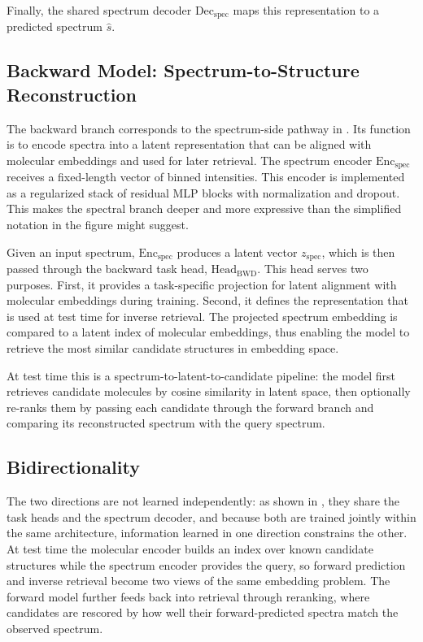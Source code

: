 Finally, the shared spectrum decoder $\mathrm{Dec}_{\mathrm{spec}}$ maps this representation to a predicted spectrum $\hat{s}$.

\subsection{Backward Model: Spectrum-to-Structure Reconstruction}

The backward branch corresponds to the spectrum-side pathway in . 
Its function is to encode spectra into a latent representation that can be aligned with molecular embeddings and used for later retrieval. The spectrum encoder $\mathrm{Enc}_{\mathrm{spec}}$ receives a fixed-length vector of binned intensities.
This encoder is implemented as a regularized stack of residual MLP blocks with normalization and dropout. 
This makes the spectral branch deeper and more expressive than the simplified notation in the figure might suggest.

Given an input spectrum, $\mathrm{Enc}_{\mathrm{spec}}$ produces a latent vector $z_{\mathrm{spec}}$, which is then passed through the backward task head, \texttt{$\text{Head}_{\mathrm{BWD}}$}.
This head serves two purposes. First, it provides a task-specific projection for latent alignment with molecular embeddings during training. 
Second, it defines the representation that is used at test time for inverse retrieval. 
The projected spectrum embedding is compared to a latent index of molecular embeddings, thus enabling the model to retrieve the most similar candidate structures in embedding space.

At test time this is a spectrum-to-latent-to-candidate pipeline: the model first retrieves candidate molecules by cosine similarity in latent space, then optionally re-ranks them by passing each candidate through the forward branch and comparing its reconstructed spectrum with the query spectrum.

\subsection{Bidirectionality}

The two directions are not learned independently: as shown in , they share the task heads and the spectrum decoder, and because both are trained jointly within the same architecture, information learned in one direction constrains the other.
At test time the molecular encoder builds an index over known candidate structures while the spectrum encoder provides the query, so forward prediction and inverse retrieval become two views of the same embedding problem.
The forward model further feeds back into retrieval through reranking, where candidates are rescored by how well their forward-predicted spectra match the observed spectrum.

